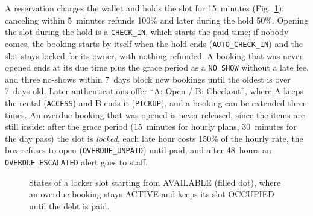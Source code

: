 \documentclass[journal,onecolumn]{IEEEtran}
\begin{document}
A reservation charges the wallet and holds the slot for 15~minutes (Fig.~\ref{fig:state}); canceling within
5~minutes refunds 100\% and later during the hold 50\%. Opening the slot during the hold is a \texttt{CHECK\_IN}, which
starts the paid time; if nobody comes, the booking starts by itself when the hold ends (\texttt{AUTO\_CHECK\_IN}) and
the slot stays locked for its owner, with nothing refunded. A booking that was never opened ends at its due time plus
the grace period as a \texttt{NO\_SHOW} without a late fee, and three no-shows within 7~days block new bookings until
the oldest is over 7~days old. Later authentications offer ``A: Open / B: Checkout'', where A keeps the rental
(\texttt{ACCESS}) and B ends it (\texttt{PICKUP}), and a booking can be extended three times. An overdue booking that
was opened is never released, since the items are still inside: after the grace period (15~minutes for hourly plans,
30~minutes for the day pass) the slot is \emph{locked}, each late hour costs 150\% of the hourly rate, the box refuses
to open (\texttt{OVERDUE\_UNPAID}) until paid, and after 48~hours an \texttt{OVERDUE\_ESCALATED} alert goes to staff.

\begin{figure}[!htbp]
\centering
{}
\caption{States of a locker slot starting from AVAILABLE (filled dot), where an overdue booking stays ACTIVE and keeps
its slot OCCUPIED until the debt is paid.}
\label{fig:state}
\end{figure}
\end{document}
